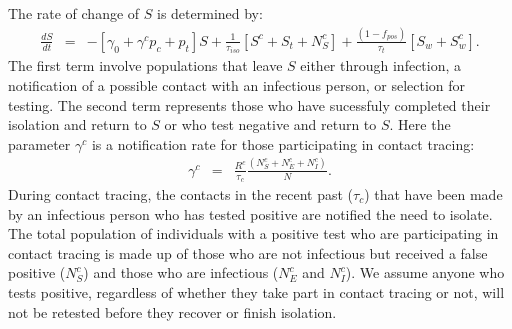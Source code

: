 \documentclass[notitlepage, superscriptaddress]{revtex4-2}
\begin{document}
The rate of change of $S$ is determined by:
\begin{eqnarray}
\label{E:dS}
\frac{dS}{dt} &=& - [\gamma_{0}  + \gamma^{c} p_{c} +p_{t}] S + \frac{1}{\tau_{iso}}[S^{c} + S_{t} + N^{c}_{S}] + \frac{(1-f_{pos})}{\tau_{t}}[S_{w} + S^{c}_{w}].
\end{eqnarray}
The first term involve populations that leave $S$ either through infection, a notification of a possible contact with an infectious person, or selection for testing. The second term represents those who have sucessfuly completed their isolation and return to $S$ or who test negative and return to $S$. Here the parameter $\gamma^{c}$ is a notification rate for those participating in contact tracing:
\begin{eqnarray}
\label{E:notificationrate}
\gamma^{c} &=& \frac{R^{c}}{\tau_{c}} \frac{(N^{c}_{S} + N^{c}_{E} + N^{c}_{I}) }{N}.
\end{eqnarray}
During contact tracing, the contacts in the recent past ($\tau_{c}$) that have been made by an infectious person who has tested positive are notified the need to isolate. The total population of individuals with a positive test who are participating in contact tracing is made up of those who are not infectious but received a false positive ($N^{c}_{S}$) and those who are infectious ($N^{c}_{E}$ and $N^{c}_{I}$). We assume anyone who tests positive, regardless of whether they take part in contact tracing or not, will not be retested before they recover or finish isolation. 
\end{document}
